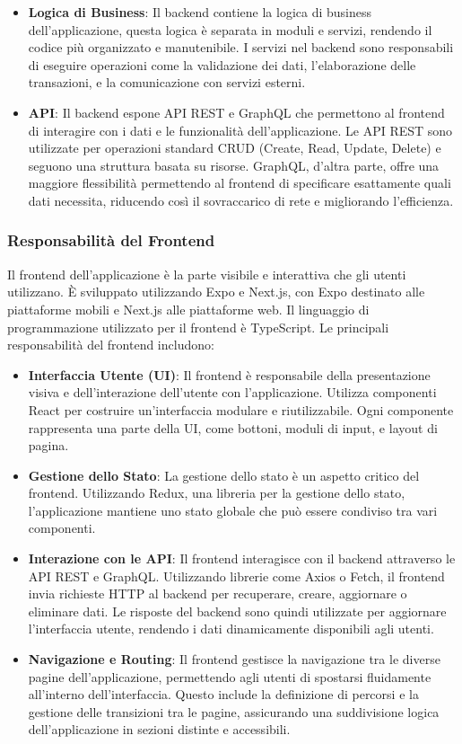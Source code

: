 \begin{itemize}
    \item \textbf{Logica di Business}: Il backend contiene la logica di business dell'applicazione, questa logica è separata in moduli e servizi, rendendo il codice più organizzato e manutenibile.
    I servizi nel backend sono responsabili di eseguire operazioni come la validazione dei dati, l'elaborazione delle transazioni, e la comunicazione con servizi esterni.
    \item \textbf{API}: Il backend espone API REST e GraphQL che permettono al frontend di interagire con i dati e le funzionalità dell'applicazione. Le API REST sono utilizzate per operazioni standard CRUD (Create, Read, Update, Delete) e seguono una struttura basata su risorse. GraphQL, d'altra parte, offre una maggiore flessibilità permettendo al frontend di specificare esattamente quali dati necessita, riducendo così il sovraccarico di rete e migliorando l'efficienza.
\end{itemize}

\subsubsection*{Responsabilità del Frontend}
Il frontend dell'applicazione è la parte visibile e interattiva che gli utenti utilizzano.
È sviluppato utilizzando Expo e Next.js, con Expo destinato alle piattaforme mobili e Next.js alle piattaforme web.
Il linguaggio di programmazione utilizzato per il frontend è TypeScript. Le principali responsabilità del frontend includono:
    \begin{itemize}
        \item \textbf{Interfaccia Utente (UI)}: Il frontend è responsabile della presentazione visiva e dell'interazione dell'utente con l'applicazione.
        Utilizza componenti React per costruire un'interfaccia modulare e riutilizzabile. Ogni componente rappresenta una parte della UI, come bottoni, moduli di input, e layout di pagina.
        \item \textbf{Gestione dello Stato}: La gestione dello stato è un aspetto critico del frontend. Utilizzando Redux, una libreria per la gestione dello stato, l'applicazione mantiene uno stato globale che può essere condiviso tra vari componenti.
        \item \textbf{Interazione con le API}: Il frontend interagisce con il backend attraverso le API REST e GraphQL. Utilizzando librerie come Axios o Fetch, il frontend invia richieste HTTP al backend per recuperare, creare, aggiornare o eliminare dati.
        Le risposte del backend sono quindi utilizzate per aggiornare l'interfaccia utente, rendendo i dati dinamicamente disponibili agli utenti.
        \item \textbf{Navigazione e Routing}: Il frontend gestisce la navigazione tra le diverse pagine dell'applicazione, permettendo agli utenti di spostarsi fluidamente all'interno dell'interfaccia.
        Questo include la definizione di percorsi e la gestione delle transizioni tra le pagine, assicurando una suddivisione logica dell'applicazione in sezioni distinte e accessibili.
    \end{itemize}

